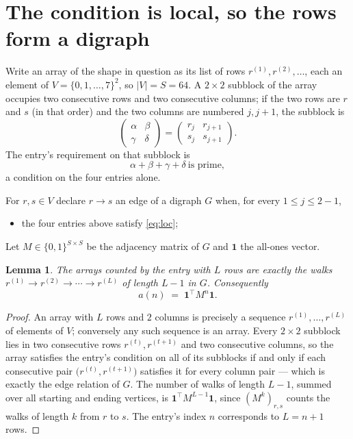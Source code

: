 \documentclass[11pt,a4paper]{article}
\theoremstyle{plain}
\newtheorem{lemma}[theorem]{Lemma}
\theoremstyle{definition}
\begin{document}
\section{The condition is local, so the rows form a digraph}

Write an array of the shape in question as its list of rows
$r^{(1)},r^{(2)},\dots$, each an element of
$V=\{0,1,\dots,7\}^{2}$, so $|V|=S=64$. A $2\times2$ subblock of the array
occupies two consecutive rows and two consecutive columns; if the two rows are $r$
and $s$ (in that order) and the two columns are numbered $j,j+1$,
the subblock is
\[
\begin{pmatrix}\alpha&\beta\\\gamma&\delta\end{pmatrix}=\begin{pmatrix}r_j&r_{j+1}\\s_j&s_{j+1}\end{pmatrix}.
\]
The entry's requirement on that subblock is
\begin{equation}\label{eq:loc}
\alpha+\beta+\gamma+\delta\ \text{is prime},
\end{equation}
a condition on the four entries alone.

For $r,s\in V$ declare $r\to s$ an edge of a digraph $G$ when, for every
$1\le j\le 2-1$,
\begin{itemize}
\item the four entries above satisfy \eqref{eq:loc};

\end{itemize}
Let $M\in\{0,1\}^{S\times S}$ be the adjacency matrix of $G$ and $\mathbf{1}$ the
all-ones vector.

\begin{lemma}\label{lem:walk}
The arrays counted by the entry with $L$ rows are exactly the walks
$r^{(1)}\to r^{(2)}\to\cdots\to r^{(L)}$ of length $L-1$ in $G$. Consequently
\[
a(n)\;=\;\mathbf{1}^{\!\top}M^{n}\mathbf{1} .
\]
\end{lemma}

\begin{proof}
An array with $L$ rows and $2$ columns is precisely a sequence
$r^{(1)},\dots,r^{(L)}$ of elements of $V$; conversely any such sequence is an array.
Every $2\times2$ subblock lies in two consecutive rows $r^{(t)},r^{(t+1)}$ and two
consecutive columns, so the array satisfies the entry's condition on all of its subblocks
if and only if each consecutive pair $\bigl(r^{(t)},r^{(t+1)}\bigr)$ satisfies it for
every column pair --- which is exactly the edge relation of $G$. The number of walks of
length $L-1$, summed over all starting and ending vertices, is
$\mathbf{1}^{\!\top}M^{L-1}\mathbf{1}$, since $(M^{k})_{r,s}$ counts the walks of
length $k$ from $r$ to $s$. The entry's index $n$ corresponds to $L=n+1$ rows.
\end{proof}
\end{document}
